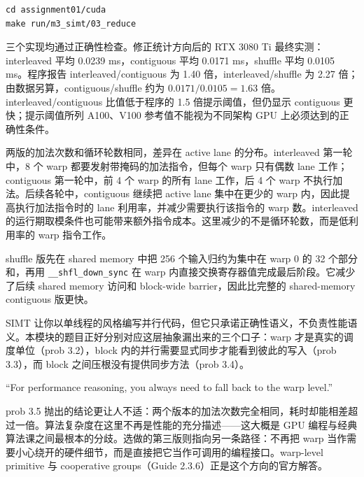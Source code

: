 \documentclass[11pt,a4paper,fontset=none]{ctexart}
\begin{document}
\begin{lstlisting}
cd assignment01/cuda
make run/m3_simt/03_reduce
\end{lstlisting}

\begin{tcolorbox}[title={3.5 实验记录与分析}]
三个实现均通过正确性检查。修正统计方向后的 RTX 3080 Ti 最终实测：interleaved 平均 0.0239 ms，contiguous 平均 0.0171 ms，shuffle 平均 0.0105 ms。程序报告 interleaved/contiguous 为 1.40 倍，interleaved/shuffle 为 2.27 倍；由数据另算，contiguous/shuffle 约为 $0.0171/0.0105=1.63$ 倍。interleaved/contiguous 比值低于程序的 1.5 倍提示阈值，但仍显示 contiguous 更快；提示阈值所列 A100、V100 参考值不能视为不同架构 GPU 上必须达到的正确性条件。

两版的加法次数和循环轮数相同，差异在 active lane 的分布。interleaved 第一轮中，8 个 warp 都要发射带掩码的加法指令，但每个 warp 只有偶数 lane 工作；contiguous 第一轮中，前 4 个 warp 的所有 lane 工作，后 4 个 warp 不执行加法。后续各轮中，contiguous 继续把 active lane 集中在更少的 warp 内，因此提高执行加法指令时的 lane 利用率，并减少需要执行该指令的 warp 数。interleaved 的运行期取模条件也可能带来额外指令成本。这里减少的不是循环轮数，而是低利用率的 warp 指令工作。

shuffle 版先在 shared memory 中把 256 个输入归约为集中在 warp 0 的 32 个部分和，再用 \texttt{\_\_shfl\_down\_sync} 在 warp 内直接交换寄存器值完成最后阶段。它减少了后续 shared memory 访问和 block-wide barrier，因此比完整的 shared-memory contiguous 版更快。
\end{tcolorbox}

\begin{lookback}
SIMT 让你以单线程的风格编写并行代码，但它只承诺正确性语义，不负责性能语义。本模块的题目正好分别对应这层抽象漏出来的三个口子：warp 才是真实的调度单位（prob 3.2），block 内的并行需要显式同步才能看到彼此的写入（prob 3.3），而 block 之间压根没有提供同步方法（prob 3.4）。

``For performance reasoning, you always need to fall back to the warp level.''

prob 3.5 抛出的结论更让人不适：两个版本的加法次数完全相同，耗时却能相差超过一倍。算法复杂度在这里不再是性能的充分描述——这大概是 GPU 编程与经典算法课之间最根本的分歧。选做的第三版则指向另一条路径：不再把 warp 当作需要小心绕开的硬件细节，而是直接把它当作可调用的编程接口。warp-level primitive 与 cooperative groups（Guide 2.3.6）正是这个方向的官方解答。
\end{lookback}

\end{document}

